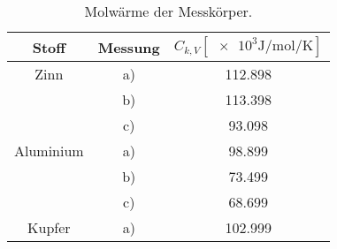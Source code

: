 \begin{table}
    \centering
    \caption{Molwärme der Messkörper.}
    \label{tab:C_k-Werte}
    \begin{tabular}{c c | S[table-format=4.2]}
        \toprule
        Stoff & Messung & $C_{k,V}[\num{e3}\si{\joule\per\mol\per\kelvin}]$ \\
        \midrule
        Zinn        & a) & 112.898 \\
                    & b) & 113.398 \\
                    & c) &  93.098 \\
        Aluminium   & a) &  98.899 \\
                    & b) &  73.499 \\
                    & c) &  68.699 \\
        Kupfer      & a) & 102.999 \\
        \bottomrule
    \end{tabular}
\end{table}